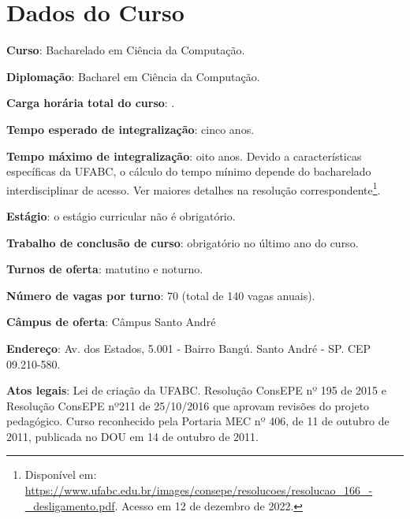 \section{Dados do Curso}
\label{sec:dados_curso}

\textbf{Curso}: Bacharelado em Ciência da Computação.

\textbf{Diplomação}: Bacharel em Ciência da Computação.

\textbf{Carga horária total do curso}: .

\textbf{Tempo esperado de integralização}: cinco anos.  

\textbf{Tempo máximo de integralização}: oito anos. Devido a características
específicas da UFABC, o cálculo do tempo mínimo depende do bacharelado
interdisciplinar de acesso. Ver maiores detalhes na resolução
correspondente\footnote{Disponível em:
\url{https://www.ufabc.edu.br/images/consepe/resolucoes/resolucao_166_-_desligamento.pdf}.
Acesso em 12 de dezembro de 2022.}.

\textbf{Estágio}: o estágio curricular não é obrigatório.

\textbf{Trabalho de conclusão de curso}: obrigatório no último ano do curso.

\textbf{Turnos de oferta}: matutino e noturno.

\textbf{Número de vagas por turno}: 70 (total de 140 vagas anuais).

\textbf{Câmpus de oferta}: Câmpus Santo André

\textbf{Endereço}: Av. dos Estados, 5.001 - Bairro Bangú. Santo André
- SP. CEP 09.210-580.

\textbf{Atos legais}: Lei de criação da UFABC. Resolução ConsEPE nº
195 de 2015 e Resolução ConsEPE nº211 de 25/10/2016 que aprovam
revisões do projeto pedagógico. Curso reconhecido pela Portaria MEC nº
406, de 11 de outubro de 2011, publicada no DOU em 14 de outubro de
2011.
